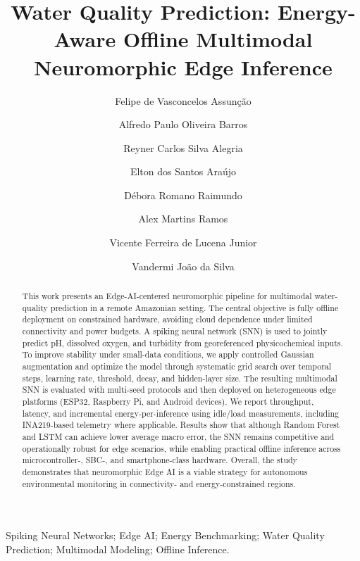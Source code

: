 \documentclass[a4paper]{ifacconf}
\begin{document}
\begin{frontmatter}

\title{Water Quality Prediction: Energy-Aware Offline Multimodal Neuromorphic Edge Inference}

\author[UFAM,ELD,PPGCTS]{Felipe de Vasconcelos Assun\c{c}\~ao}
\author[UFAM,PPGCTS]{Alfredo Paulo Oliveira Barros}
\author[UFAM]{Reyner Carlos Silva Alegria}
\author[IND]{Elton dos Santos Ara\'ujo}
\author[ELD]{D\'ebora Romano Raimundo}
\author[UFAM]{Alex Martins Ramos}
\author[UFAM]{Vicente Ferreira de Lucena Junior}
\author[UFAM,PPGCTS]{Vandermi Jo\~ao da Silva}

\address[UFAM]{Federal University of Amazonas (UFAM), Institute of Exact and Technological Sciences (ICET), Itacoatiara, Brazil (e-mail: \{felipe.assuncao, alfredo.barros, reyner.alegria, alexmartins, vicente, vandermi\}@ufam.edu.br).}
\address[IND]{Independent Researcher, Brazil (e-mail: elton\_araujo\_@hotmail.com).}
\address[ELD]{Eldorado Research Institute, Brazil (e-mail: debora.raimundo@eldorado.org.br).}
\address[PPGCTS]{Postgraduate Program in Science, Technology and Health (PPGCTS), Brazil.}

\renewcommand{\abstractname}{{\bf Abstract:~}}
\begin{abstract}
This work presents an Edge-AI-centered neuromorphic pipeline for multimodal water-quality prediction in a remote Amazonian setting. The central objective is fully offline deployment on constrained hardware, avoiding cloud dependence under limited connectivity and power budgets. A spiking neural network (SNN) is used to jointly predict pH, dissolved oxygen, and turbidity from georeferenced physicochemical inputs. To improve stability under small-data conditions, we apply controlled Gaussian augmentation and optimize the model through systematic grid search over temporal steps, learning rate, threshold, decay, and hidden-layer size. The resulting multimodal SNN is evaluated with multi-seed protocols and then deployed on heterogeneous edge platforms (ESP32, Raspberry Pi, and Android devices). We report throughput, latency, and incremental energy-per-inference using idle/load measurements, including INA219-based telemetry where applicable. Results show that although Random Forest and LSTM can achieve lower average macro error, the SNN remains competitive and operationally robust for edge scenarios, while enabling practical offline inference across microcontroller-, SBC-, and smartphone-class hardware. Overall, the study demonstrates that neuromorphic Edge AI is a viable strategy for autonomous environmental monitoring in connectivity- and energy-constrained regions.
\end{abstract}

\begin{keyword}
Spiking Neural Networks; Edge AI; Energy Benchmarking; Water Quality Prediction; Multimodal Modeling; Offline Inference.
\end{keyword}

\end{frontmatter}
\end{document}
